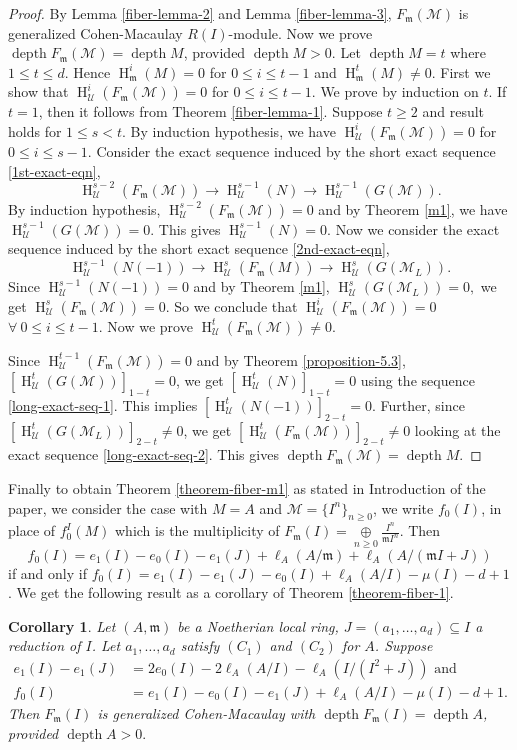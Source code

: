 \documentclass[11pt,reqno]{amsart}
\newtheorem{corollary}[theorem]{Corollary}
\theoremstyle{definition}
\newcommand{\m}{\mathfrak m}
\def\U{{\mathcal U}}
\def\M{{\mathcal M}}
\DeclareMathOperator{\h}{H}
\DeclareMathOperator{\depth}{depth}
\numberwithin{equation}{section}
\begin{document}
\begin{proof}
By Lemma \ref{fiber-lemma-2} and Lemma \ref{fiber-lemma-3}, $F_\m(\M)$ is generalized Cohen-Macaulay $R(I)$-module. Now we prove $\depth F_\m(\M)=\depth M$, provided $\depth M>0.$ Let $\depth M= t$ where $1\leq t \leq d.$ Hence $\h^i_\m(M)=0$ for $0\leq i \leq t-1$ and $\h^t_\m(M)\neq 0.$ First we show that $\h^i_\U(F_\m(\M))=0$ for $0\leq i \leq t-1.$ We prove by induction on $t.$ If $t=1$, then it follows from Theorem \ref{fiber-lemma-1}. Suppose $t\geq 2$ and result holds for $1\leq s< t.$ By induction hypothesis, we have $\h^i_\U(F_\m(\M))=0$ for $0\leq i \leq s-1.$ Consider the exact sequence induced by the short exact sequence \eqref{1st-exact-eqn},
$$
\h^{s-2}_\U(F_\m(\M))
\to \h^{s-1}_\U(N)\to \h^{s-1}_\U(G(\M)). $$
By induction hypothesis, $\h^{s-2}_\U(F_\m(\M))=0$ and by Theorem \ref{m1}, we have $\h^{s-1}_\U(G(\M))=0$. This gives $\h^{s-1}_\U(N)=0.$ Now we consider the exact sequence induced by the short exact sequence \eqref{2nd-exact-eqn},
$$
\h^{s-1}_\U(N(-1))\to \h^s_\U(F_\m(M))\to \h^s_\U(G(\M_L)). 
$$
Since $\h^{s-1}_\U(N(-1))=0$ and by Theorem \ref{m1}, $\h^s_\U(G(\M_L))=0,$ we get $\h^s_\U (F_\m(\M))=0.$ So we conclude that $\h^i_\U(F_\m(\M))=0$  $\forall ~ 0\leq i \leq t-1.$ Now we prove $\h^t_\U(F_\m(\M))\neq 0$. 

Since $\h^{t-1}_\U(F_\m(\M))=0$ and by Theorem \ref{proposition-5.3}, $[\h^t_\U(G(\M))]_{1-t}=0$, we get $[\h^t_\U(N)]_{1-t}=0$ using the sequence \eqref{long-exact-seq-1}. This implies $[\h^t_\U(N(-1))]_{2-t}=0.$ Further, since $[\h^t_\U(G(\M_L))]_{2-t}\neq 0$, we get $[\h^t_\U(F_\m(\M))]_{2-t}\neq 0$ looking at the exact sequence \eqref{long-exact-seq-2}. This gives  $\depth F_\m(\M)= \depth M .$
\end{proof}
Finally to obtain Theorem \ref{theorem-fiber-m1} as stated in Introduction of the paper, we consider the case with $M=A$ and $\M=\{I^n\}_{n\geq 0}$, we write 
$f_0(I)$, in place of $f_0^I(M)$ which is the multiplicity of $F_\m(I)=\mathop\oplus\limits_{n\geq 0}\frac{I^n}{\m I^n}$. Then $$f_0(I)= e_1(I)-e_0(I)-e_1(J)+\ell_A(A/\m)+\ell_A(A/(\m I+J))$$ if and only if $f_0(I)=e_1(I)-e_1(J)-e_0(I)+\ell_A(A/I)-\mu(I)-d+1$. We get the following result as a corollary of Theorem \ref{theorem-fiber-1}. 
\begin{corollary}\label{corollary_8.5}
	Let $(A,\m)$ be a Noetherian local ring,  $J=(a_1,\ldots,a_d)\subseteq I$  a reduction of $I$. Let $a_1,\ldots,a_d$  satisfy $(C_1)$ and $(C_2)$ for $A$.  Suppose 	\begin{align}\label{8.7}
		e_1(I)-e_1(J)&=2e_0(I)-2\ell_A(A/I)-\ell_A(I/(I^2+J))%
        \text{ and }\\
		\label{8.8}f_0(I)&= e_1(I)-e_0(I)-e_1(J)+\ell_A(A/I)-\mu(I)-d+1.	%
	\end{align} Then  
	$F_\m(I)$ is generalized Cohen-Macaulay with $\depth F_\m(I)=\depth A$, provided $\depth A>0.$
	\end{corollary}
\end{document}
